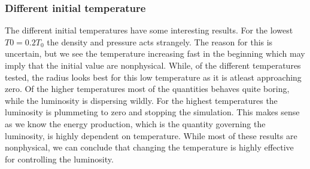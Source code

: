 \documentclass[11pt,a4paper,twocolumn,titlepage]{article}
\begin{document}
\subsubsection{Different initial temperature} \label{subsubsec:Method/Different_temperatures}
The different initial temperatures have some interesting results. For the lowest $T0=0.2T_0$ the density and pressure acts strangely. The reason for this is uncertain, but we see the temperature increasing fast in the beginning which may imply that the initial value are nonphysical. While, of the different temperatures tested, the radius looks best for this low temperature as it is atleast approaching zero. Of the higher temperatures most of the quantities behaves quite boring, while the luminosity is dispersing wildly. For the highest temperatures the luminosity is plummeting to zero and stopping the simulation. This makes sense as we know the energy production, which is the quantity governing the luminosity, is highly dependent on temperature. While most of these results are nonphysical, we can conclude that changing the temperature is highly effective for controlling the luminosity.
\end{document}
